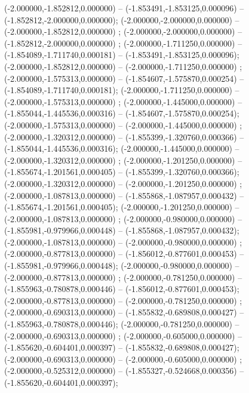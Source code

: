  (-2.000000,-1.852812,0.000000) -- (-1.853491,-1.853125,0.000096) -- (-1.852812,-2.000000,0.000000);
 (-2.000000,-2.000000,0.000000) -- (-2.000000,-1.852812,0.000000) ;
 (-2.000000,-2.000000,0.000000) -- (-1.852812,-2.000000,0.000000) ;
 (-2.000000,-1.711250,0.000000) -- (-1.854089,-1.711740,0.000181) -- (-1.853491,-1.853125,0.000096);
 (-2.000000,-1.852812,0.000000) -- (-2.000000,-1.711250,0.000000) ;
 (-2.000000,-1.575313,0.000000) -- (-1.854607,-1.575870,0.000254) -- (-1.854089,-1.711740,0.000181);
 (-2.000000,-1.711250,0.000000) -- (-2.000000,-1.575313,0.000000) ;
 (-2.000000,-1.445000,0.000000) -- (-1.855044,-1.445536,0.000316) -- (-1.854607,-1.575870,0.000254);
 (-2.000000,-1.575313,0.000000) -- (-2.000000,-1.445000,0.000000) ;
 (-2.000000,-1.320312,0.000000) -- (-1.855399,-1.320760,0.000366) -- (-1.855044,-1.445536,0.000316);
 (-2.000000,-1.445000,0.000000) -- (-2.000000,-1.320312,0.000000) ;
 (-2.000000,-1.201250,0.000000) -- (-1.855674,-1.201561,0.000405) -- (-1.855399,-1.320760,0.000366);
 (-2.000000,-1.320312,0.000000) -- (-2.000000,-1.201250,0.000000) ;
 (-2.000000,-1.087813,0.000000) -- (-1.855868,-1.087957,0.000432) -- (-1.855674,-1.201561,0.000405);
 (-2.000000,-1.201250,0.000000) -- (-2.000000,-1.087813,0.000000) ;
 (-2.000000,-0.980000,0.000000) -- (-1.855981,-0.979966,0.000448) -- (-1.855868,-1.087957,0.000432);
 (-2.000000,-1.087813,0.000000) -- (-2.000000,-0.980000,0.000000) ;
 (-2.000000,-0.877813,0.000000) -- (-1.856012,-0.877601,0.000453) -- (-1.855981,-0.979966,0.000448);
 (-2.000000,-0.980000,0.000000) -- (-2.000000,-0.877813,0.000000) ;
 (-2.000000,-0.781250,0.000000) -- (-1.855963,-0.780878,0.000446) -- (-1.856012,-0.877601,0.000453);
 (-2.000000,-0.877813,0.000000) -- (-2.000000,-0.781250,0.000000) ;
 (-2.000000,-0.690313,0.000000) -- (-1.855832,-0.689808,0.000427) -- (-1.855963,-0.780878,0.000446);
 (-2.000000,-0.781250,0.000000) -- (-2.000000,-0.690313,0.000000) ;
 (-2.000000,-0.605000,0.000000) -- (-1.855620,-0.604401,0.000397) -- (-1.855832,-0.689808,0.000427);
 (-2.000000,-0.690313,0.000000) -- (-2.000000,-0.605000,0.000000) ;
 (-2.000000,-0.525312,0.000000) -- (-1.855327,-0.524668,0.000356) -- (-1.855620,-0.604401,0.000397);
